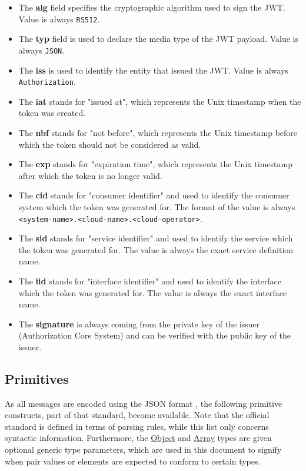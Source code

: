 \documentclass[a4paper]{arrowhead}
\newcommand{\pref}[1]{{\textcolor{ArrowheadGrey}{\hyperref[sec:model:primitives:#1]{#1}}}}
\begin{document}
\begin{itemize}
    \item The \textbf{alg} field specifies the cryptographic algorithm used to sign the JWT. Value is always \texttt{RS512}.
    \item The \textbf{typ} field is used to declare the media type of the JWT payload. Value is always \texttt{JSON}.
    \item The \textbf{iss} is used to identify the entity that issued the JWT. Value is always \texttt{Authorization}.
    \item The \textbf{iat} stands for "issued at", which represents the Unix timestamp when the token was created.
    \item The \textbf{nbf} stands for "not before", which represents the Unix timestamp before which the token should not be considered as valid. 
    \item The \textbf{exp} stands for "expiration time", which represents the Unix timestamp after which the token is no longer valid.
    \item The \textbf{cid} stands for "consumer identifier" and used to identify the consumer system which the token was generated for. The format of the value is always \texttt{<system-name>.<cloud-name>.<cloud-operator>}.
    \item The \textbf{sid} stands for "service identifier" and used to identify the service which the token was generated for. The value is always the exact service definition name.
    \item The \textbf{iid} stands for "interface identifier" and used to identify the interface which the token was generated for. The value is always the exact interface name.
    \item The \textbf{signature} is always coming from the private key of the issuer (Authorization Core System) and can be verified with the public key of the issuer.
\end{itemize}

\subsection{Primitives}
\label{sec:model:primitives}

As all messages are encoded using the JSON format \cite{bray2014json}, the following primitive constructs, part of that standard, become available.
Note that the official standard is defined in terms of parsing rules, while this list only concerns syntactic information.
Furthermore, the \pref{Object} and \pref{Array} types are given optional generic type parameters, which are used in this document to signify when pair values or elements are expected to conform to certain types. 
\end{document}
